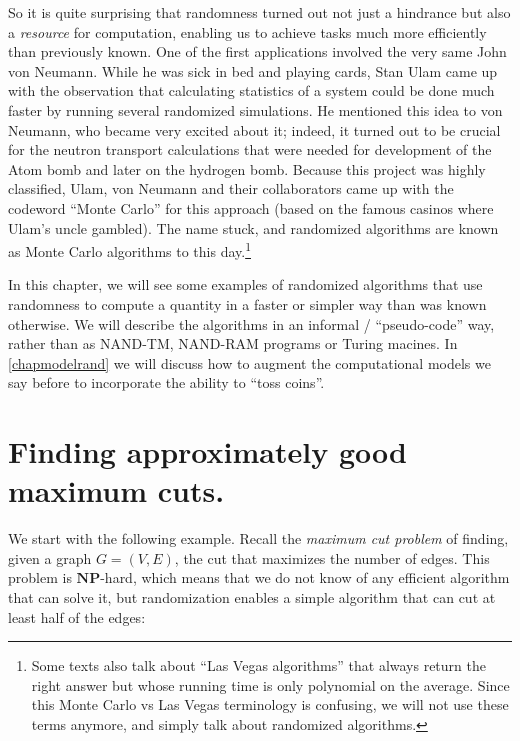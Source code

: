 So it is quite surprising that randomness turned out not just a
hindrance but also a \emph{resource} for computation, enabling us to
achieve tasks much more efficiently than previously known. One of the
first applications involved the very same John von Neumann. While he was
sick in bed and playing cards, Stan Ulam came up with the observation
that calculating statistics of a system could be done much faster by
running several randomized simulations. He mentioned this idea to von
Neumann, who became very excited about it; indeed, it turned out to be
crucial for the neutron transport calculations that were needed for
development of the Atom bomb and later on the hydrogen bomb. Because
this project was highly classified, Ulam, von Neumann and their
collaborators came up with the codeword ``Monte Carlo'' for this
approach (based on the famous casinos where Ulam's uncle gambled). The
name stuck, and randomized algorithms are known as Monte Carlo
algorithms to this day.\footnote{Some texts also talk about ``Las Vegas
  algorithms'' that always return the right answer but whose running
  time is only polynomial on the average. Since this Monte Carlo vs Las
  Vegas terminology is confusing, we will not use these terms anymore,
  and simply talk about randomized algorithms.}

In this chapter, we will see some examples of randomized algorithms that
use randomness to compute a quantity in a faster or simpler way than was
known otherwise. We will describe the algorithms in an informal /
``pseudo-code'' way, rather than as NAND-TM, NAND-RAM programs or Turing
macines. In \cref{chapmodelrand} we will discuss how to augment the
computational models we say before to incorporate the ability to ``toss
coins''.

\section{Finding approximately good maximum
cuts.}\label{Finding-approximately-goo}

We start with the following example. Recall the \emph{maximum cut
problem} of finding, given a graph \(G=(V,E)\), the cut that maximizes
the number of edges. This problem is \(\mathbf{NP}\)-hard, which means
that we do not know of any efficient algorithm that can solve it, but
randomization enables a simple algorithm that can cut at least half of
the edges:

\hypertarget{maxcutthm}{}

